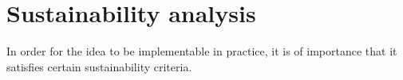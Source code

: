 \section{Sustainability analysis}
In order for the idea to be implementable in practice, it is of importance that it satisfies certain sustainability criteria. 

